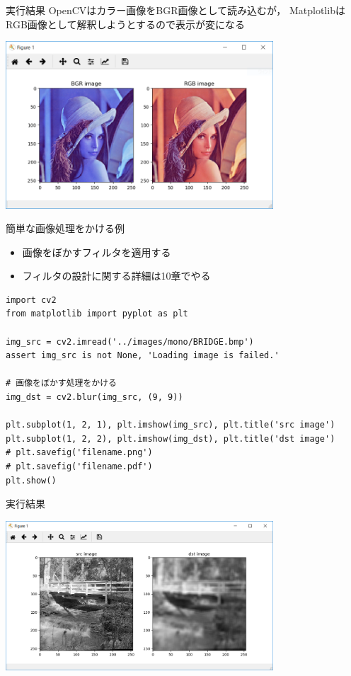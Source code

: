 \documentclass[10pt]{beamer}
\begin{document}
	\begin{frame}{実行結果}
		OpenCVはカラー画像をBGR画像として読み込むが，
		MatplotlibはRGB画像として解釈しようとするので表示が変になる
		\begin{center}
			\includegraphics[width=10cm]{./figs/bgr_rgb.png}
		\end{center}
	\end{frame}
	
	\begin{frame}[fragile]{簡単な画像処理をかける例}
	    \begin{itemize}
	        \item 画像をぼかすフィルタを適用する
	        \item フィルタの設計に関する詳細は10章でやる
	    \end{itemize}
	    \scriptsize
	    \begin{verbatim}
import cv2
from matplotlib import pyplot as plt

img_src = cv2.imread('../images/mono/BRIDGE.bmp')
assert img_src is not None, 'Loading image is failed.'

# 画像をぼかす処理をかける
img_dst = cv2.blur(img_src, (9, 9))

plt.subplot(1, 2, 1), plt.imshow(img_src), plt.title('src image')
plt.subplot(1, 2, 2), plt.imshow(img_dst), plt.title('dst image')
# plt.savefig('filename.png')
# plt.savefig('filename.pdf')
plt.show()
	    \end{verbatim}
	\end{frame}
	
	\begin{frame}{実行結果}
		\begin{center}
			\includegraphics[width=10cm]{./figs/blur.png}
		\end{center}
	\end{frame}
	
\end{document}
